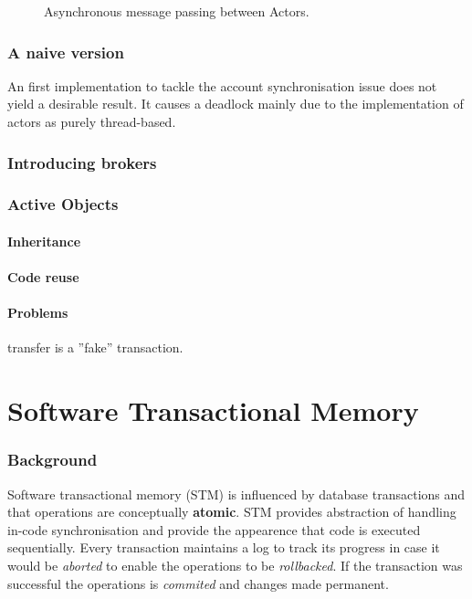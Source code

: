 \documentclass[a4paper,12pt]{kth-mag}
\begin{document}
\begin{figure}
    \begin{center}
    \end{center}
    \caption{Asynchronous message passing between Actors.}
    \label{fig:msg_actors}
\end{figure}

\section{A naive version}
An first implementation to tackle the account synchronisation issue does not yield a desirable result. It causes a deadlock mainly due to the implementation of actors as purely thread-based.

\section{Introducing brokers}
\section{Active Objects}
\subsection{Inheritance}
\subsection{Code reuse}
\subsection{Problems}
transfer is a ''fake'' transaction.

\part{ Software Transactional Memory}

\section{Background}
Software transactional memory (STM) is influenced by database transactions and that operations are conceptually \textbf{atomic}. STM provides abstraction of handling in-code synchronisation and provide the appearence that code is executed sequentially. Every transaction maintains a log to track its progress in case it would be \textit{aborted} to enable the operations to be \textit{rollbacked}. If the transaction was successful the operations is \textit{commited} and changes made permanent.
\end{document}
